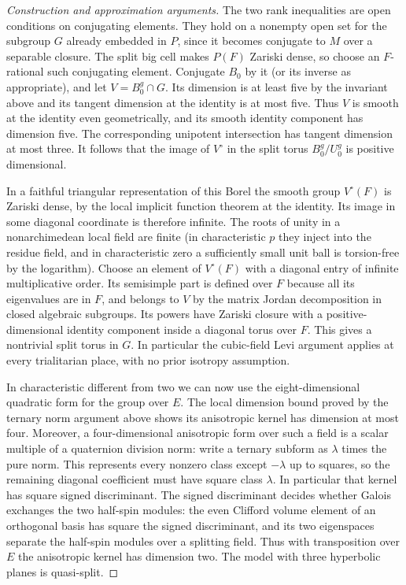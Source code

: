 \documentclass[11pt,a4paper,openany,oneside]{book}
\theoremstyle{resultstyle}
\theoremstyle{definition}
\numberwithin{equation}{chapter}
\begin{document}
\begin{proof}[Construction and approximation arguments]
The two rank inequalities are open conditions on conjugating
elements. They hold on a nonempty open set for the subgroup \(G\)
already embedded in \(P\), since it becomes conjugate to \(M\)
over a separable closure. The split big cell makes \(P(F)\)
Zariski dense, so choose an \(F\)-rational such conjugating element.
Conjugate \(B_0\) by it (or its inverse as appropriate), and let
\(V=B_0^g\cap G\). Its dimension is at least five by the invariant
above and its tangent dimension at the identity is at most five.
Thus \(V\) is smooth at the identity even geometrically, and its
smooth identity component has dimension five. The corresponding
unipotent intersection has tangent dimension at most three.
It follows that the image of \(V^\circ\) in the split torus
\(B_0^g/U_0^g\) is positive dimensional.

In a faithful triangular representation of this Borel the smooth
group \(V^\circ(F)\) is Zariski dense, by the local implicit
function theorem at the identity. Its image in some diagonal
coordinate is therefore infinite. The roots of unity in a
nonarchimedean local field are finite (in characteristic \(p\)
they inject into the residue field, and in characteristic zero a
sufficiently small unit ball is torsion-free by the logarithm).
Choose an element of \(V^\circ(F)\) with a diagonal entry of
infinite multiplicative order. Its semisimple part is defined
over \(F\) because all its eigenvalues are in \(F\), and belongs
to \(V\) by the matrix Jordan decomposition in closed algebraic
subgroups. Its powers have Zariski closure with a positive-dimensional
identity component inside a diagonal torus over \(F\).
This gives a nontrivial split torus in \(G\). In particular the
cubic-field Levi argument applies at every trialitarian place,
with no prior isotropy assumption.

In characteristic different from two we can now use the
eight-dimensional quadratic form for the group over \(E\). The local dimension
bound proved by the ternary norm argument above shows
its anisotropic kernel has dimension at most four.
Moreover, a four-dimensional anisotropic form over
such a field is a scalar multiple of a quaternion
division norm: write a ternary subform as \(\lambda\)
times the pure norm. This represents every nonzero
class except \(-\lambda\) up to squares, so the
remaining diagonal coefficient must have square class
\(\lambda\). In particular that kernel has square
signed discriminant. The signed discriminant decides
whether Galois exchanges the two half-spin modules:
the even Clifford volume element of an orthogonal
basis has square the signed discriminant, and its
two eigenspaces separate the half-spin modules over
a splitting field. Thus with transposition over \(E\)
the anisotropic kernel has dimension two. The model
with three hyperbolic planes is quasi-split.


\end{proof}
\end{document}
